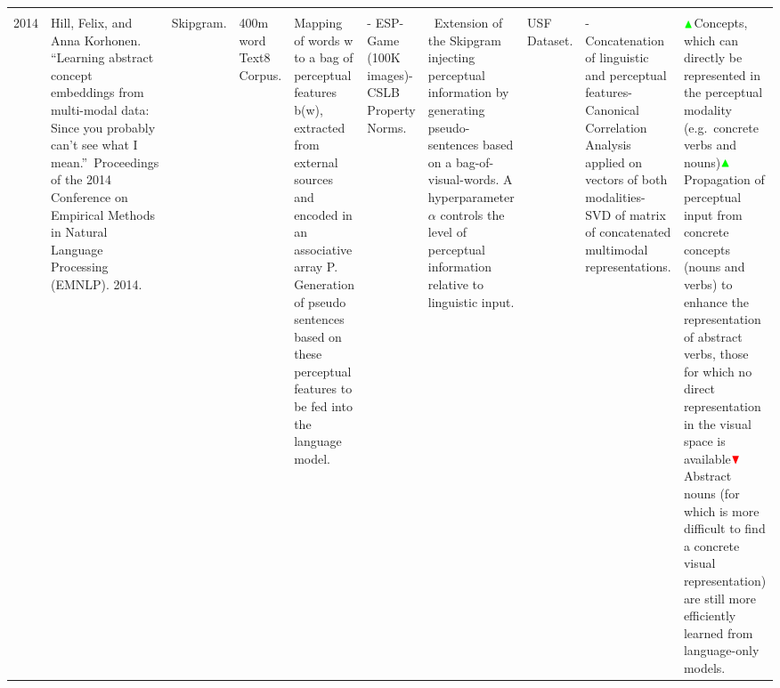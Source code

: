 \documentclass[
]{krantz}
\begin{document}
\begin{longtable}[]{@{}llllllllll@{}}
\begin{minipage}[t]{0.13\columnwidth}
\end{minipage}\tabularnewline
\begin{minipage}[t]{0.00\columnwidth}\raggedright
2014\strut
\end{minipage} & \begin{minipage}[t]{0.06\columnwidth}\raggedright
Hill, Felix, and Anna Korhonen. ``Learning abstract concept embeddings from multi-modal data: Since you probably can't see what I mean.''~Proceedings of the 2014 Conference on Empirical Methods in Natural Language Processing (EMNLP). 2014.\strut
\end{minipage} & \begin{minipage}[t]{0.04\columnwidth}\raggedright
Skipgram.\strut
\end{minipage} & \begin{minipage}[t]{0.02\columnwidth}\raggedright
400m word Text8 Corpus.\strut
\end{minipage} & \begin{minipage}[t]{0.07\columnwidth}\raggedright
Mapping of words w to a bag of perceptual features b(w), extracted from external sources and encoded in an associative array P. Generation of pseudo sentences based on these perceptual features to be fed into the language model.\strut
\end{minipage} & \begin{minipage}[t]{0.05\columnwidth}\raggedright
- ESP-Game (100K images)- CSLB Property Norms.\strut
\end{minipage} & \begin{minipage}[t]{0.25\columnwidth}\raggedright
~Extension of the Skipgram injecting perceptual information by generating pseudo-sentences based on a bag-of-visual-words. A hyperparameter \(\alpha\) controls the level of perceptual information relative to linguistic input.\strut
\end{minipage} & \begin{minipage}[t]{0.08\columnwidth}\raggedright
USF Dataset.\strut
\end{minipage} & \begin{minipage}[t]{0.05\columnwidth}\raggedright
- Concatenation of linguistic and perceptual features- Canonical Correlation Analysis applied on vectors of both modalities- SVD of matrix of concatenated multimodal representations.\strut
\end{minipage} & \begin{minipage}[t]{0.13\columnwidth}\raggedright
\(\color{green}\blacktriangle\)Concepts, which can directly be represented in the perceptual modality (e.g.~concrete verbs and nouns)\(\color{green}\blacktriangle\)Propagation of perceptual input from concrete concepts (nouns and verbs) to enhance the representation of abstract verbs, those for which no direct representation in the visual space is available\(\color{red}\blacktriangledown\)Abstract nouns (for which is more difficult to find a concrete visual representation) are still more efficiently learned from language-only models.\strut

\end{minipage}
\end{longtable}
\end{document}

